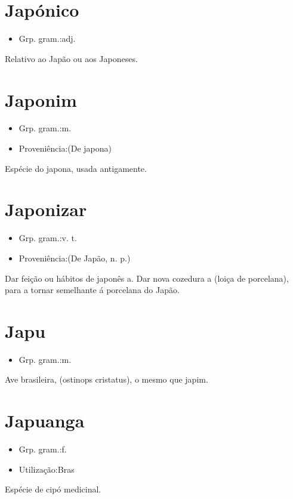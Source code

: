 \documentclass{article}
\begin{document}
\section{Japónico}
\begin{itemize}
\item {Grp. gram.:adj.}
\end{itemize}
Relativo ao Japão ou aos Japoneses.
\section{Japonim}
\begin{itemize}
\item {Grp. gram.:m.}
\end{itemize}
\begin{itemize}
\item {Proveniência:(De \textunderscore japona\textunderscore )}
\end{itemize}
Espécie do japona, usada antigamente.
\section{Japonizar}
\begin{itemize}
\item {Grp. gram.:v. t.}
\end{itemize}
\begin{itemize}
\item {Proveniência:(De \textunderscore Japão\textunderscore , n. p.)}
\end{itemize}
Dar feição ou hábitos de japonês a.
Dar nova cozedura a (loiça de porcelana), para a tornar semelhante á porcelana do Japão.
\section{Japu}
\begin{itemize}
\item {Grp. gram.:m.}
\end{itemize}
Ave brasileira, (\textunderscore ostinops cristatus\textunderscore ), o mesmo que \textunderscore japim\textunderscore .
\section{Japuanga}
\begin{itemize}
\item {Grp. gram.:f.}
\end{itemize}
\begin{itemize}
\item {Utilização:Bras}
\end{itemize}
Espécie de cipó medicinal.
\end{document}
